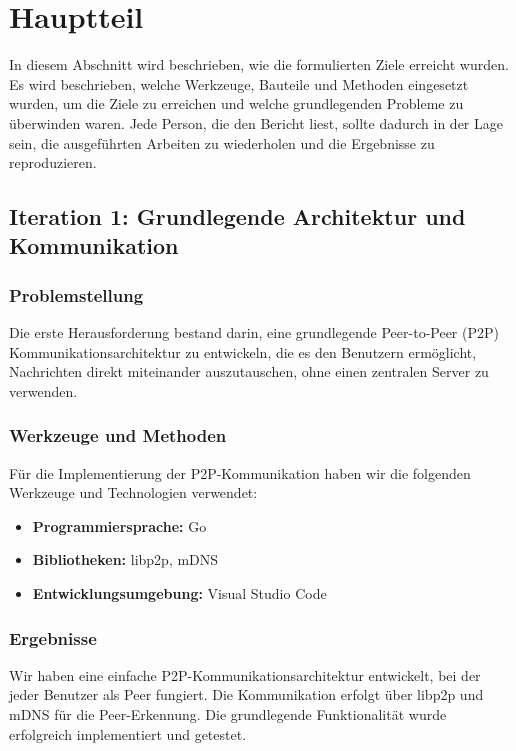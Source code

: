 \section{Hauptteil}

In diesem Abschnitt wird beschrieben, wie die formulierten Ziele erreicht wurden. Es wird beschrieben, welche Werkzeuge, Bauteile und Methoden eingesetzt wurden, um die Ziele zu erreichen und welche grundlegenden Probleme zu überwinden waren. Jede Person, die den Bericht liest, sollte dadurch in der Lage sein, die ausgeführten Arbeiten zu wiederholen und die Ergebnisse zu reproduzieren.

\subsection{Iteration 1: Grundlegende Architektur und Kommunikation}

\subsubsection{Problemstellung}
Die erste Herausforderung bestand darin, eine grundlegende Peer-to-Peer (P2P) Kommunikationsarchitektur zu entwickeln, die es den Benutzern ermöglicht, Nachrichten direkt miteinander auszutauschen, ohne einen zentralen Server zu verwenden.

\subsubsection{Werkzeuge und Methoden}
Für die Implementierung der P2P-Kommunikation haben wir die folgenden Werkzeuge und Technologien verwendet:
\begin{itemize}
    \item \textbf{Programmiersprache:} Go
    \item \textbf{Bibliotheken:} libp2p, mDNS
    \item \textbf{Entwicklungsumgebung:} Visual Studio Code
\end{itemize}

\subsubsection{Ergebnisse}
Wir haben eine einfache P2P-Kommunikationsarchitektur entwickelt, bei der jeder Benutzer als Peer fungiert. Die Kommunikation erfolgt über libp2p und mDNS für die Peer-Erkennung. Die grundlegende Funktionalität wurde erfolgreich implementiert und getestet.

